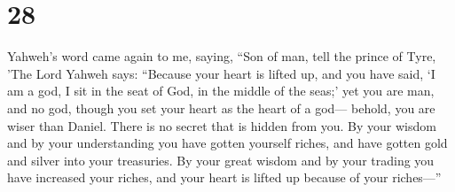 \hypertarget{section-26}{%
\section{28}\label{section-26}}

 Yahweh's word came again to me, saying, 
``Son of man, tell the prince of Tyre, 'The Lord Yahweh says: ``Because
your heart is lifted up, and you have said, `I am a god, I sit in the
seat of God, in the middle of the seas;' yet you are man, and no god,
though you set your heart as the heart of a god--- 
behold, you are wiser than Daniel. There is no secret that is hidden
from you.  By your wisdom and by your understanding you
have gotten yourself riches, and have gotten gold and silver into your
treasuries.  By your great wisdom and by your trading you
have increased your riches, and your heart is lifted up because of your
riches---''

